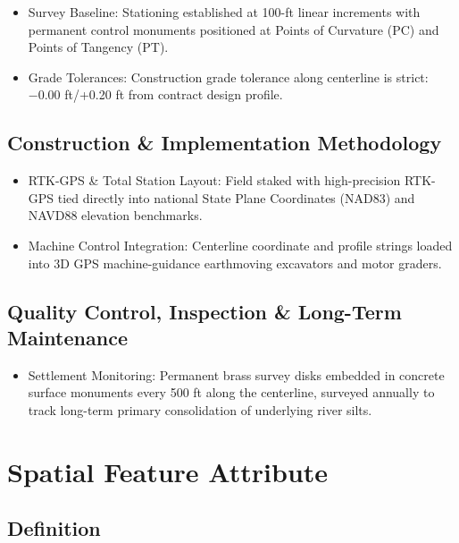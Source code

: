 \documentclass[
  letterpaper,
  DIV=11,
  numbers=noendperiod]{scrreprt}
\providecommand{\tightlist}{%
  \setlength{\itemsep}{0pt}\setlength{\parskip}{0pt}}
\begin{document}
\begin{itemize}
\item
  Survey Baseline: Stationing established at 100-ft linear increments
  with permanent control monuments positioned at Points of Curvature
  (PC) and Points of Tangency (PT).
\item
  Grade Tolerances: Construction grade tolerance along centerline is
  strict: −0.00 ft/+0.20 ft from contract design profile.
\end{itemize}

\subsection{Construction \& Implementation
Methodology}\label{construction-implementation-methodology-2}

\begin{itemize}
\item
  RTK-GPS \& Total Station Layout: Field staked with high-precision
  RTK-GPS tied directly into national State Plane Coordinates (NAD83)
  and NAVD88 elevation benchmarks.
\item
  Machine Control Integration: Centerline coordinate and profile strings
  loaded into 3D GPS machine-guidance earthmoving excavators and motor
  graders.
\end{itemize}

\subsection{Quality Control, Inspection \& Long-Term
Maintenance}\label{quality-control-inspection-long-term-maintenance-2}

\begin{itemize}
\tightlist
\item
  Settlement Monitoring: Permanent brass survey disks embedded in
  concrete surface monuments every 500 ft along the centerline, surveyed
  annually to track long-term primary consolidation of underlying river
  silts.
\end{itemize}

\section{Spatial Feature Attribute}\label{spatial-feature-attribute-2}

\subsection{Definition}\label{definition-2}
\end{document}
